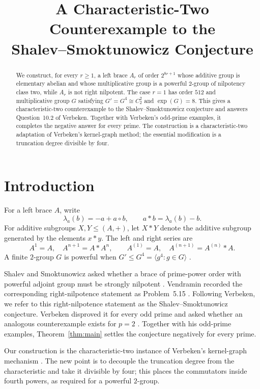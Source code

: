 \documentclass[11pt]{amsart}
\title[A characteristic-two counterexample]
{A Characteristic-Two Counterexample to the\\
Shalev--Smoktunowicz Conjecture}
\date{}
\begin{document}
\begin{abstract}
We construct, for every $r\geq1$, a left brace $A_r$ of order $2^{8r+1}$
whose additive group is elementary abelian and whose multiplicative group is
a powerful $2$-group of nilpotency class two, while $A_r$ is not right
nilpotent. The case $r=1$ has order $512$ and multiplicative group $G$
satisfying $G'=G^4\cong C_2^2$ and $\operatorname{exp}(G)=8$. This gives a
characteristic-two counterexample to the Shalev--Smoktunowicz conjecture and
answers Question~10.2 of Verbeken. Together with Verbeken's odd-prime
examples, it completes the negative answer for every prime. The construction
is a characteristic-two adaptation of Verbeken's kernel-graph method; the
essential modification is a truncation degree divisible by four.
\end{abstract}

\maketitle

\section{Introduction}

For a left brace $A$, write
\[
  \lambda_a(b)=-a+a\circ b,
  \qquad
  a*b=\lambda_a(b)-b.
\]
For additive subgroups $X,Y\leq(A,+)$, let $X*Y$ denote the additive
subgroup generated by the elements $x*y$. The left and right series are
\[
 A^1=A,\quad A^{n+1}=A*A^n,
 \qquad
 A^{(1)}=A,\quad A^{(n+1)}=A^{(n)}*A.
\]
A finite $2$-group $G$ is powerful when
$G'\leq G^4=\langle g^4:g\in G\rangle$ \cite{LubotzkyMann}.

Shalev and Smoktunowicz asked whether a brace of prime-power order with
powerful adjoint group must be strongly nilpotent
\cite[Question~1]{ShalevSmoktunowicz}. Vendramin recorded the corresponding
right-nilpotence statement as Problem~5.15
\cite[Problem~5.15]{Vendramin}. Following Verbeken, we refer to this
right-nilpotence statement as the Shalev--Smoktunowicz conjecture.
Verbeken disproved it for every odd prime and asked whether an analogous
counterexample exists for $p=2$ \cite[Question~10.2]{Verbeken}.
Together with his odd-prime examples, Theorem~\ref{thm:main} settles the
conjecture negatively for every prime.

Our construction is the characteristic-two instance of Verbeken's
kernel-graph mechanism \cite[Proposition~2.2]{Verbeken}. The new point is to
decouple the truncation degree from the characteristic and take it divisible
by four; this places the commutators inside fourth powers, as required for a
powerful $2$-group.
\end{document}
